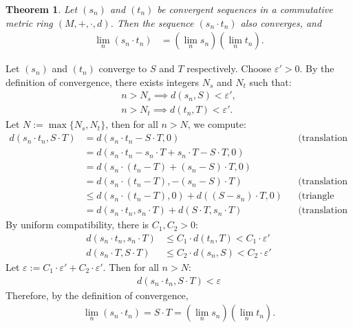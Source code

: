 \documentclass{amsart}
\numberwithin{equation}{section}
\let\oldendproof\endproof
\renewenvironment{proof}[1][\proofname]{%
  \setcounter{case}{0}
  \setcounter{step}{0}
  \oldproof[#1]%
}{\oldendproof}
\theoremstyle{plain}
\newtheorem{theorem}{Theorem}[section]
\theoremstyle{definition}
\theoremstyle{remark}
\begin{document}
\begin{theorem}
  Let $(s_n)$ and $(t_n)$ be convergent sequences in a commutative metric ring $(M, +, \cdot, d)$. Then the sequence $(s_n \cdot t_n)$ also converges, and
  \begin{align*}
    \lim_n (s_n \cdot t_n) &= \left(\lim_n s_n\right)\left( \lim_n t_n\right).
  \end{align*}
\end{theorem}
\begin{proof}
  Let $(s_n)$ and $(t_n)$ converge to $S$ and $T$ respectively.
  Choose $\varepsilon'>0$.
  By the definition of convergence, there exists integers $N_s$ and $N_t$ such that:
  \begin{align*}
    n > N_s \implies d(s_n, S) < \varepsilon',\\
    n > N_t \implies d(t_n, T) < \varepsilon'.
  \end{align*}
  Let $N := \max\{N_s, N_t\}$, then for all $n > N$, we compute:
  \begin{align*}
    d(s_n \cdot t_n, S \cdot T)
    &= d(s_n \cdot t_n - S \cdot T, 0) && \text{(translation invariance)}\\
    &= d(s_n \cdot t_n -s_n \cdot T + s_n \cdot T - S \cdot T, 0)\\
    &= d(s_n \cdot (t_n - T) + (s_n - S) \cdot T, 0)\\
    &= d(s_n \cdot (t_n - T), -(s_n - S) \cdot T) && \text{(translation invariance)}\\
    &\leq d(s_n \cdot (t_n - T), 0) + d((S-s_n) \cdot T, 0) && \text{(triangle inequality)}\\
    &= d(s_n \cdot t_n , s_n \cdot T) +d(S \cdot T, s_n\cdot T) && \text{(translation invariance)}
  \end{align*}
  By uniform compatibility, there is $C_1, C_2>0$:
  \begin{align*}
    d(s_n\cdot t_n, s_n\cdot T)&\leq C_1\cdot d(t_n, T) < C_1 \cdot \varepsilon'\\
    d(s_n\cdot T, S\cdot T)&\leq C_2\cdot d(s_n, S) < C_2 \cdot \varepsilon'
  \end{align*}
  Let $\varepsilon:=C_1\cdot \varepsilon' + C_2 \cdot \varepsilon'$. Then for all $n > N$:
  \begin{align*}
    d(s_n \cdot t_n, S \cdot T) < \varepsilon
  \end{align*}
  Therefore, by the definition of convergence,
  \begin{align*}
    \lim_n \left(s_n \cdot t_n\right)= S \cdot T = \left(\lim_n s_n\right)\left( \lim_n t_n\right).
  \end{align*}
\end{proof}
\end{document}
